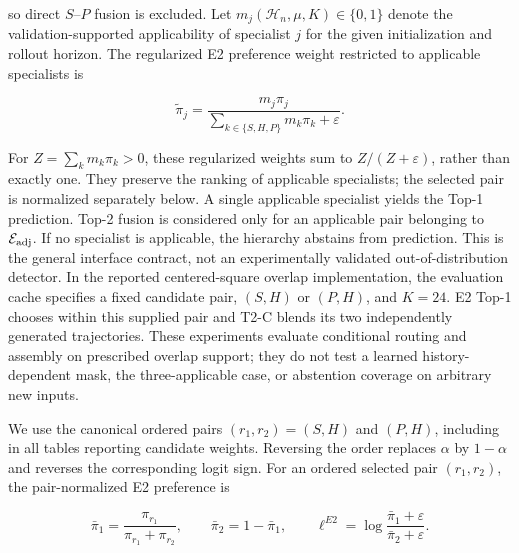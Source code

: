 \documentclass{article}
\providecommand{\DIFaddtex}[1]{{\protect\color{blue} \sf #1}} %
\providecommand{\DIFdeltex}[1]{{\protect\color{red} \scriptsize #1}} %
\providecommand{\DIFaddbegin}{} %
\providecommand{\DIFaddend}{} %
\providecommand{\DIFdelbegin}{} %
\providecommand{\DIFdelend}{} %
\providecommand{\DIFadd}[1]{\texorpdfstring{\DIFaddtex{#1}}{#1}} %
\providecommand{\DIFdel}[1]{\texorpdfstring{\DIFdeltex{#1}}{}} %
\begin{document}
so direct $S$--$P$ fusion is excluded.
Let
$m_j(\mathcal H_n,\mu,K)\in\{0,1\}$
denote the validation-supported applicability of specialist $j$ for the
given initialization and rollout horizon.
The \DIFaddbegin \DIFadd{regularized }\DIFaddend E2 \DIFdelbegin \DIFdel{preference }\DIFdelend \DIFaddbegin \DIFadd{weight }\DIFaddend restricted to applicable specialists is


\begin{equation}
  \widetilde\pi_j
  =
  \frac{
    m_j\pi_j
  }{
    \sum_{k\in\{S,H,P\}}m_k\pi_k+\varepsilon
  }.
  \label{eq:app_masked_e2}
\end{equation}


\DIFaddbegin \DIFadd{For $Z=\sum_k m_k\pi_k>0$, these regularized weights sum to $Z/(Z+\varepsilon)$, rather than exactly one. They preserve the ranking of applicable specialists; the selected pair is normalized separately below. }\DIFaddend A single applicable specialist yields the Top-1 prediction.
Top-2 fusion is considered only for an applicable pair belonging to
$\mathcal E_{\rm adj}$.
If no specialist is applicable, the hierarchy abstains from prediction. \DIFaddbegin \DIFadd{This is the general interface contract, not an experimentally validated out-of-distribution detector. In the reported centered-square overlap implementation, the evaluation cache specifies a fixed candidate pair, $(S,H)$ or $(P,H)$, and $K=24$. E2 Top-1 chooses within this supplied pair and T2-C blends its two independently generated trajectories. These experiments evaluate conditional routing and assembly on prescribed overlap support; they do not test a learned history-dependent mask, the three-applicable case, or abstention coverage on arbitrary new inputs.
}\DIFaddend 

\DIFaddbegin \DIFadd{We use the canonical ordered pairs $(r_1,r_2)=(S,H)$ and $(P,H)$, including in all tables reporting candidate weights. Reversing the order replaces $\alpha$ by $1-\alpha$ and reverses the corresponding logit sign. }\DIFaddend For an ordered selected pair $(r_1,r_2)$, the pair-normalized E2
preference is


\begin{equation}
  \bar\pi_1
  =
  \frac{\pi_{r_1}}
       {\pi_{r_1}+\pi_{r_2}},
  \qquad
  \bar\pi_2
  =
  1-\bar\pi_1,
  \qquad
  \ell^{E2}
  =
  \log
  \frac{\bar\pi_1+\varepsilon}
       {\bar\pi_2+\varepsilon}.
  \label{eq:app_pair_logit}
\end{equation}
\end{document}

